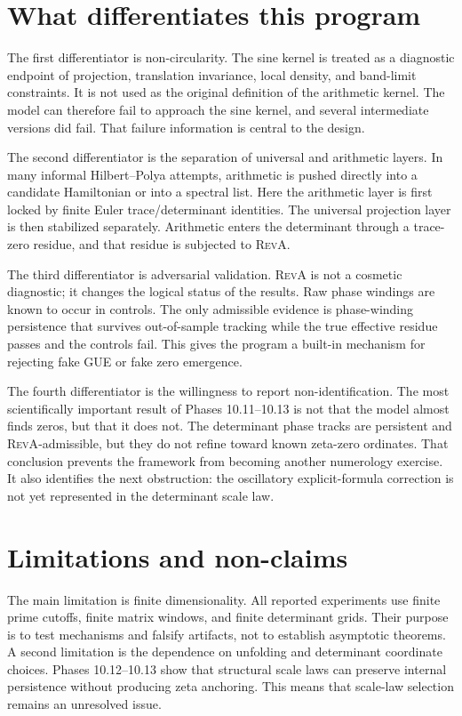 \documentclass[11pt]{article}
\newcommand{\RevA}{\textsc{RevA}}
\theoremstyle{definition}
\theoremstyle{plain}
\begin{document}
\section{What differentiates this program}

The first differentiator is non-circularity.  The sine kernel is treated as a diagnostic endpoint of projection, translation invariance, local density, and band-limit constraints.  It is not used as the original definition of the arithmetic kernel.  The model can therefore fail to approach the sine kernel, and several intermediate versions did fail.  That failure information is central to the design.

The second differentiator is the separation of universal and arithmetic layers.  In many informal Hilbert--Polya attempts, arithmetic is pushed directly into a candidate Hamiltonian or into a spectral list.  Here the arithmetic layer is first locked by finite Euler trace/determinant identities.  The universal projection layer is then stabilized separately.  Arithmetic enters the determinant through a trace-zero residue, and that residue is subjected to \RevA{}.

The third differentiator is adversarial validation.  \RevA{} is not a cosmetic diagnostic; it changes the logical status of the results.  Raw phase windings are known to occur in controls.  The only admissible evidence is phase-winding persistence that survives out-of-sample tracking while the true effective residue passes and the controls fail.  This gives the program a built-in mechanism for rejecting fake GUE or fake zero emergence.

The fourth differentiator is the willingness to report non-identification.  The most scientifically important result of Phases 10.11--10.13 is not that the model almost finds zeros, but that it does not.  The determinant phase tracks are persistent and \RevA-admissible, but they do not refine toward known zeta-zero ordinates.  That conclusion prevents the framework from becoming another numerology exercise.  It also identifies the next obstruction: the oscillatory explicit-formula correction is not yet represented in the determinant scale law.

\section{Limitations and non-claims}

The main limitation is finite dimensionality.  All reported experiments use finite prime cutoffs, finite matrix windows, and finite determinant grids.  Their purpose is to test mechanisms and falsify artifacts, not to establish asymptotic theorems.  A second limitation is the dependence on unfolding and determinant coordinate choices.  Phases 10.12--10.13 show that structural scale laws can preserve internal persistence without producing zeta anchoring.  This means that scale-law selection remains an unresolved issue.
\end{document}
